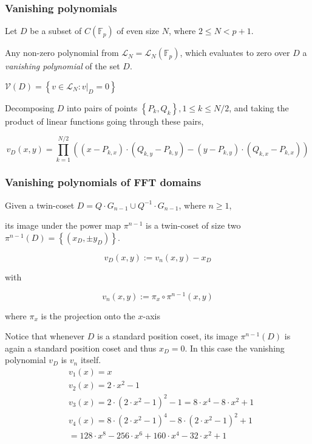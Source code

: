 \documentclass{beamer}
\begin{document}
\begin{frame}
	\frametitle{Vanishing polynomials}
	Let $D$ be a subset of $C\left(\mathbb{F}_p\right)$ of even size $N$, where $2 \leq N<p+1$. 
	\begin{definition}
		Any non-zero polynomial from $\mathcal{L}_N=\mathcal{L}_N\left(\mathbb{F}_p\right)$, which evaluates to zero over $D$ a \emph{vanishing polynomial} of the set $D$. 
		
		$\mathcal{V}(D)=\left\{v \in \mathcal{L}_N:\left.v\right|_D=0\right\}$

	\end{definition}
		
	
	Decomposing $D$ into pairs of points $\left\{P_k, Q_k\right\}, 1 \leq k \leq N / 2$, and taking the product of linear functions going through these pairs,

$$
v_D(x, y)=\prod_{k=1}^{N / 2}\left(\left(x-P_{k, x}\right) \cdot\left(Q_{k, y}-P_{k, y}\right)-\left(y-P_{k, y}\right) \cdot\left(Q_{k, x}-P_{k, x}\right)\right)
$$

\end{frame}

\begin{frame}
	\frametitle{Vanishing polynomials of FFT domains}
	Given a twin-coset $D=Q \cdot G_{n-1} \cup Q^{-1} \cdot G_{n-1}$, where $n \geq 1$, 
	
	its image under the power map $\pi^{n-1}$ is a twin-coset of size two $\pi^{n-1}(D)=\left\{\left(x_D, \pm y_D\right)\right\}$. 
	

\begin{definition}
	$$
v_D(x, y):=v_n(x, y)-x_D
$$

with

$$
v_n(x, y):=\pi_x \circ \pi^{n-1}(x, y)
$$

where $\pi_x$ is the projection onto the $x$-axis
\end{definition}



\end{frame} 

\begin{frame}
Notice that whenever $D$ is a standard position coset, its image $\pi^{n-1}(D)$ is again a standard position coset and thus $x_D=0$. In this case the vanishing polynomial $v_D$ is $v_n$ itself. 
$$
\begin{aligned}
& v_1(x)=x \\
& v_2(x)=2 \cdot x^2-1 \\
& v_3(x)=2 \cdot\left(2 \cdot x^2-1\right)^2-1=8 \cdot x^4-8 \cdot x^2+1 \\
& v_4(x)=8 \cdot\left(2 \cdot x^2-1\right)^4-8 \cdot\left(2 \cdot x^2-1\right)^2+1\\
&=128 \cdot x^8-256 \cdot x^6+160 \cdot x^4-32 \cdot x^2+1
\end{aligned}
$$

\end{frame}
\end{document}
